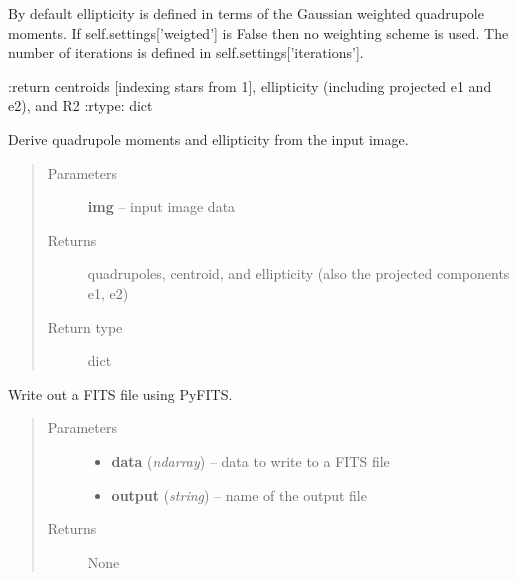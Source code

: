 \documentclass[a4paper,11pt,english]{sphinxmanual}
\begin{document}
\begin{fulllineitems}
\begin{fulllineitems}
By default ellipticity is defined in terms of the Gaussian weighted quadrupole moments.
If self.settings{[}'weigted'{]} is False then no weighting scheme is used.
The number of iterations is defined in self.settings{[}'iterations'{]}.

:return centroids {[}indexing stars from 1{]}, ellipticity (including projected e1 and e2), and R2
:rtype: dict

\end{fulllineitems}


\begin{fulllineitems}
\label{analysis:analysis.shape.shapeMeasurement.quadrupoles}
Derive quadrupole moments and ellipticity from the input image.
\begin{quote}\begin{description}
\item[{Parameters}] \leavevmode
\textbf{img} -- input image data

\item[{Returns}] \leavevmode
quadrupoles, centroid, and ellipticity (also the projected components e1, e2)

\item[{Return type}] \leavevmode
dict

\end{description}\end{quote}

\end{fulllineitems}


\begin{fulllineitems}
\label{analysis:analysis.shape.shapeMeasurement.writeFITS}
Write out a FITS file using PyFITS.
\begin{quote}\begin{description}
\item[{Parameters}] \leavevmode\begin{itemize}
\item {} 
\textbf{data} (\emph{ndarray}) -- data to write to a FITS file

\item {} 
\textbf{output} (\emph{string}) -- name of the output file

\end{itemize}

\item[{Returns}] \leavevmode
None

\end{description}\end{quote}

\end{fulllineitems}


\end{fulllineitems}
\end{document}
